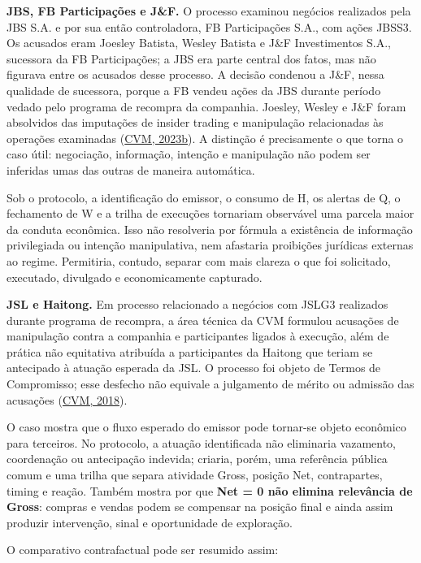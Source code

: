 \documentclass[
  a4paper,
]{article}
\begin{document}
\textbf{JBS, FB Participações e J\&F.} O processo examinou negócios
realizados pela JBS S.A. e por sua então controladora, FB Participações
S.A., com ações JBSS3. Os acusados eram Joesley Batista, Wesley Batista
e J\&F Investimentos S.A., sucessora da FB Participações; a JBS era
parte central dos fatos, mas não figurava entre os acusados desse
processo. A decisão condenou a J\&F, nessa qualidade de sucessora,
porque a FB vendeu ações da JBS durante período vedado pelo programa de
recompra da companhia. Joesley, Wesley e J\&F foram absolvidos das
imputações de insider trading e manipulação relacionadas às operações
examinadas (\protect\hyperlink{ref-13}{CVM, 2023b}). A distinção é
precisamente o que torna o caso útil: negociação, informação, intenção e
manipulação não podem ser inferidas umas das outras de maneira
automática.

Sob o protocolo, a identificação do emissor, o consumo de H, os alertas
de Q, o fechamento de W e a trilha de execuções tornariam observável uma
parcela maior da conduta econômica. Isso não resolveria por fórmula a
existência de informação privilegiada ou intenção manipulativa, nem
afastaria proibições jurídicas externas ao regime. Permitiria, contudo,
separar com mais clareza o que foi solicitado, executado, divulgado e
economicamente capturado.

\textbf{JSL e Haitong.} Em processo relacionado a negócios com JSLG3
realizados durante programa de recompra, a área técnica da CVM formulou
acusações de manipulação contra a companhia e participantes ligados à
execução, além de prática não equitativa atribuída a participantes da
Haitong que teriam se antecipado à atuação esperada da JSL. O processo
foi objeto de Termos de Compromisso; esse desfecho não equivale a
julgamento de mérito ou admissão das acusações
(\protect\hyperlink{ref-14}{CVM, 2018}).

O caso mostra que o fluxo esperado do emissor pode tornar-se objeto
econômico para terceiros. No protocolo, a atuação identificada não
eliminaria vazamento, coordenação ou antecipação indevida; criaria,
porém, uma referência pública comum e uma trilha que separa atividade
Gross, posição Net, contrapartes, timing e reação. Também mostra por que
\textbf{Net = 0 não elimina relevância de Gross}: compras e vendas podem
se compensar na posição final e ainda assim produzir intervenção, sinal
e oportunidade de exploração.

O comparativo contrafactual pode ser resumido assim:
\end{document}
